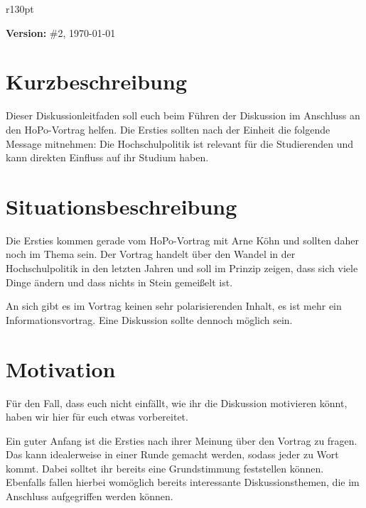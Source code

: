 \documentclass[a4paper,11pt]{scrartcl} %
\begin{document}
\thispagestyle{firststyle}

\begin{wrapfigure}{r}{130pt}
\vspace{-45pt}
  \fbox{
  \begin{minipage}{140pt}
   \tableofcontents
  \end{minipage}
  }
\end{wrapfigure}

\textbf{Version:} \#2, \today %

\section{Kurzbeschreibung} %
    Dieser Diskussionleitfaden soll euch beim Führen der Diskussion
    im Anschluss an den HoPo-Vortrag helfen. Die Ersties sollten nach 
    der Einheit die folgende Message mitnehmen:
    Die Hochschulpolitik ist relevant für die Studierenden und kann
    direkten Einfluss auf ihr Studium haben.
  
 
\section{Situationsbeschreibung} 
Die Ersties kommen gerade vom HoPo-Vortrag mit Arne Köhn und sollten daher noch im Thema sein.
Der Vortrag handelt über den Wandel in der Hochschulpolitik in den letzten Jahren und soll
im Prinzip zeigen, dass sich viele Dinge ändern und dass nichts in Stein gemeißelt ist.

An sich gibt es im Vortrag keinen sehr polarisierenden Inhalt, es ist mehr ein Informationsvortrag.
Eine Diskussion sollte dennoch möglich sein.

\section{Motivation}

Für den Fall, dass euch nicht einfällt, wie ihr die Diskussion motivieren könnt, haben wir hier für
euch etwas vorbereitet.

Ein guter Anfang ist die Ersties nach ihrer Meinung über den Vortrag zu fragen. Das kann idealerweise
in einer Runde gemacht werden, sodass jeder zu Wort kommt. Dabei solltet ihr bereits eine Grundstimmung
feststellen können. Ebenfalls fallen hierbei womöglich bereits interessante Diskussionsthemen, die im
Anschluss aufgegriffen werden können.
\end{document}
